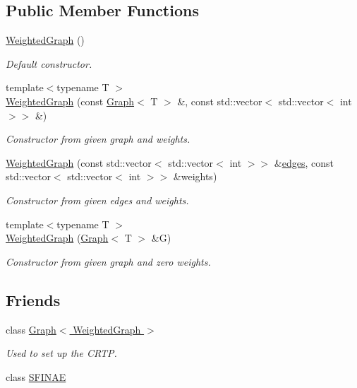 \subsection*{Public Member Functions}
\begin{DoxyCompactItemize}
\item 
\hyperlink{classMackey_1_1WeightedGraph_afed3bc23878489313a0bf8770898759a}{Weighted\+Graph} ()
\begin{DoxyCompactList}\small\item\em Default constructor. \end{DoxyCompactList}\item 
{\footnotesize template$<$typename T $>$ }\\\hyperlink{classMackey_1_1WeightedGraph_a6fdc546502bdee09851186ea582cf496}{Weighted\+Graph} (const \hyperlink{classMackey_1_1Graph}{Graph}$<$ T $>$ \&, const std\+::vector$<$ std\+::vector$<$ int $>$$>$ \&)
\begin{DoxyCompactList}\small\item\em Constructor from given graph and weights. \end{DoxyCompactList}\item 
\hyperlink{classMackey_1_1WeightedGraph_a5949ba99b50db23d59c124a4ff9a3072}{Weighted\+Graph} (const std\+::vector$<$ std\+::vector$<$ int $>$$>$ \&\hyperlink{classMackey_1_1Graph_a729ec24b9f9e504f4c4e2d3f6e2cab83}{edges}, const std\+::vector$<$ std\+::vector$<$ int $>$$>$ \&weights)
\begin{DoxyCompactList}\small\item\em Constructor from given edges and weights. \end{DoxyCompactList}\item 
{\footnotesize template$<$typename T $>$ }\\\hyperlink{classMackey_1_1WeightedGraph_ad5932440f83ea50f802d96b44c2da5e3}{Weighted\+Graph} (\hyperlink{classMackey_1_1Graph}{Graph}$<$ T $>$ \&G)
\begin{DoxyCompactList}\small\item\em Constructor from given graph and zero weights. \end{DoxyCompactList}\end{DoxyCompactItemize}
\subsection*{Friends}
\begin{DoxyCompactItemize}
\item 
class \hyperlink{classMackey_1_1WeightedGraph_aa4863e14b8d7dcd76942894cae55e453}{Graph$<$ Weighted\+Graph $>$}
\begin{DoxyCompactList}\small\item\em Used to set up the C\+R\+TP. \end{DoxyCompactList}\item 
class \hyperlink{classMackey_1_1WeightedGraph_a4a5a1a2093897e5ce4cabec8f82f5c9c}{S\+F\+I\+N\+AE}
\end{DoxyCompactItemize}
